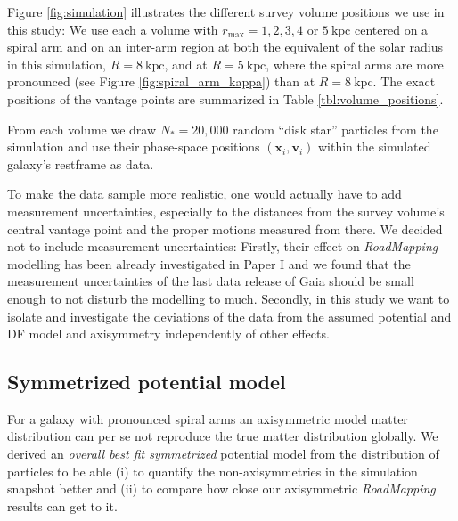 \documentclass[iop,revtex4,numberedappendix,appendixfloats]{emulateapj}
\newcommand{\vect}[1]{\boldsymbol{#1}}
\newcommand{\RM}{{\sl RoadMapping}}
\begin{document}
Figure \ref{fig:simulation} illustrates the different survey volume positions we use in this study: We use each a volume with $r_\text{max}=1,2,3,4$ or $5~\text{kpc}$ centered on a spiral arm and on an inter-arm region at both the equivalent of the solar radius in this simulation, $R=8~\text{kpc}$, and at $R=5~\text{kpc}$, where the spiral arms are more pronounced (see Figure \ref{fig:spiral_arm_kappa}) than at $R=8~\text{kpc}$. The exact positions of the vantage points are summarized in Table \ref{tbl:volume_positions}.

From each volume we draw $N_*=20,000$ random ``disk star'' particles from the simulation and use their phase-space positions $(\vect{x}_i,\vect{v}_i)$ within the simulated galaxy's restframe as data. 

To make the data sample more realistic, one would actually have to add measurement uncertainties, especially to the distances from the survey volume's central vantage point and the proper motions measured from there. We decided not to include measurement uncertainties: Firstly, their effect on \RM{} modelling has been already investigated in Paper I and we found that the measurement uncertainties of the last data release of Gaia should be small enough to not disturb the modelling to much. Secondly, in this study we want to isolate and investigate the deviations of the data from the assumed potential and DF model and axisymmetry independently of other effects.

\subsection{Symmetrized potential model} \label{sec:DEHH-Pot}

For a galaxy with pronounced spiral arms an axisymmetric model matter distribution can per se not reproduce the true matter distribution globally. We derived an \emph{overall best fit symmetrized} potential model from the distribution of particles to be able (i) to quantify the non-axisymmetries in the simulation snapshot better and (ii) to compare how close our axisymmetric \RM{} results can get to it. 
\end{document}
